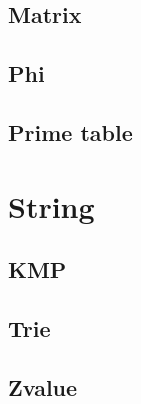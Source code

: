 \subsection{Matrix}

\subsection{Phi}

\subsection{Prime table}


\section{String}

\subsection{KMP}

\subsection{Trie}

\subsection{Zvalue}
